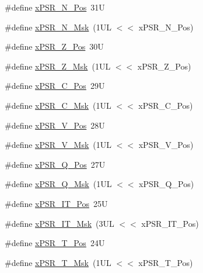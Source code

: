 \begin{DoxyCompactItemize}
\item 
\#define \hyperlink{group___c_m_s_i_s___c_o_r_e_ga031eb1b8ebcdb3d602d0b9f2ec82a7ae}{x\+P\+S\+R\+\_\+\+N\+\_\+\+Pos}~31U
\item 
\#define \hyperlink{group___c_m_s_i_s___c_o_r_e_gaf600f4ff41b62cf2f3b0a59b6d2e93d6}{x\+P\+S\+R\+\_\+\+N\+\_\+\+Msk}~(1\+U\+L $<$$<$ x\+P\+S\+R\+\_\+\+N\+\_\+\+Pos)
\item 
\#define \hyperlink{group___c_m_s_i_s___c_o_r_e_ga5869dd608eea73c80f0567d781d2230b}{x\+P\+S\+R\+\_\+\+Z\+\_\+\+Pos}~30U
\item 
\#define \hyperlink{group___c_m_s_i_s___c_o_r_e_ga907599209fba99f579778e662021c4f2}{x\+P\+S\+R\+\_\+\+Z\+\_\+\+Msk}~(1\+U\+L $<$$<$ x\+P\+S\+R\+\_\+\+Z\+\_\+\+Pos)
\item 
\#define \hyperlink{group___c_m_s_i_s___c_o_r_e_ga14adb79b91f6634b351a1b57394e2db6}{x\+P\+S\+R\+\_\+\+C\+\_\+\+Pos}~29U
\item 
\#define \hyperlink{group___c_m_s_i_s___c_o_r_e_ga21e2497255d380f956ca0f48d11d0775}{x\+P\+S\+R\+\_\+\+C\+\_\+\+Msk}~(1\+U\+L $<$$<$ x\+P\+S\+R\+\_\+\+C\+\_\+\+Pos)
\item 
\#define \hyperlink{group___c_m_s_i_s___c_o_r_e_gae0cfbb394490db402623d97e6a979e00}{x\+P\+S\+R\+\_\+\+V\+\_\+\+Pos}~28U
\item 
\#define \hyperlink{group___c_m_s_i_s___c_o_r_e_gab07f94ed3b6ee695f5af719dc27995c2}{x\+P\+S\+R\+\_\+\+V\+\_\+\+Msk}~(1\+U\+L $<$$<$ x\+P\+S\+R\+\_\+\+V\+\_\+\+Pos)
\item 
\#define \hyperlink{group___c_m_s_i_s___c_o_r_e_gaabb4178d50676a8f19cf8f727f38ace8}{x\+P\+S\+R\+\_\+\+Q\+\_\+\+Pos}~27U
\item 
\#define \hyperlink{group___c_m_s_i_s___c_o_r_e_ga133ac393c38559ae43ac36383e731dd4}{x\+P\+S\+R\+\_\+\+Q\+\_\+\+Msk}~(1\+U\+L $<$$<$ x\+P\+S\+R\+\_\+\+Q\+\_\+\+Pos)
\item 
\#define \hyperlink{group___c_m_s_i_s___c_o_r_e_gac5be1db1343f776ecd00f0a4ebe70a46}{x\+P\+S\+R\+\_\+\+I\+T\+\_\+\+Pos}~25U
\item 
\#define \hyperlink{group___c_m_s_i_s___c_o_r_e_ga6dc177aab488851bb3b98cf4b420141a}{x\+P\+S\+R\+\_\+\+I\+T\+\_\+\+Msk}~(3\+U\+L $<$$<$ x\+P\+S\+R\+\_\+\+I\+T\+\_\+\+Pos)
\item 
\#define \hyperlink{group___c_m_s_i_s___c_o_r_e_ga98d801da9a49cda944f52aeae104dd38}{x\+P\+S\+R\+\_\+\+T\+\_\+\+Pos}~24U
\item 
\#define \hyperlink{group___c_m_s_i_s___c_o_r_e_ga30ae2111816e82d47636a8d4577eb6ee}{x\+P\+S\+R\+\_\+\+T\+\_\+\+Msk}~(1\+U\+L $<$$<$ x\+P\+S\+R\+\_\+\+T\+\_\+\+Pos)
$$
\end{DoxyCompactItemize}
